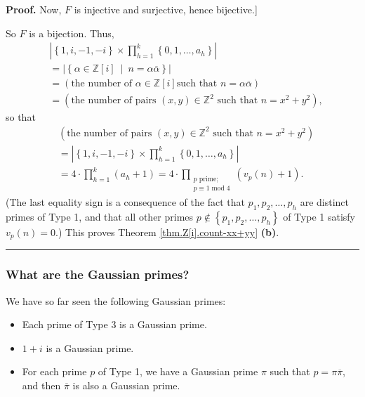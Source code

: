 \documentclass[numbers=enddot,12pt,final,onecolumn,notitlepage]{scrartcl}%
\numberwithin{exer}{subsection}
\theoremstyle{definition}
\newenvironment{proof}[1][Proof]{\noindent\textbf{#1.} }{\ \rule{0.5em}{0.5em}}
\let\prodnonlimits\prod
\renewcommand{\prod}{\prodnonlimits\limits}
\begin{document}
\begin{proof}
Now, $F$ is injective and surjective, hence bijective.]

So $F$ is a bijection. Thus,%
\begin{align*}
&  \left\vert \left\{  1,i,-1,-i\right\}  \times\prod_{h=1}^{k}\left\{
0,1,\ldots,a_{h}\right\}  \right\vert \\
&  =\left\vert \left\{  \alpha\in\mathbb{Z}\left[  i\right]  \ \mid
\ n=\alpha\overline{\alpha}\right\}  \right\vert \\
&  =\left(  \text{the number of }\alpha\in\mathbb{Z}\left[  i\right]  \text{
such that }n=\alpha\overline{\alpha}\right) \\
&  =\left(  \text{the number of pairs }\left(  x,y\right)  \in\mathbb{Z}%
^{2}\text{ such that }n=x^{2}+y^{2}\right)  ,
\end{align*}
so that%
\begin{align*}
&  \left(  \text{the number of pairs }\left(  x,y\right)  \in\mathbb{Z}%
^{2}\text{ such that }n=x^{2}+y^{2}\right) \\
&  =\left\vert \left\{  1,i,-1,-i\right\}  \times\prod_{h=1}^{k}\left\{
0,1,\ldots,a_{h}\right\}  \right\vert \\
&  =4\cdot\prod_{h=1}^{k}\left(  a_{h}+1\right)  =4\cdot\prod
_{\substack{p\text{ prime;}\\p\equiv1\operatorname{mod}4}}\left(  v_{p}\left(
n\right)  +1\right)  .
\end{align*}
(The last equality sign is a consequence of the fact that $p_{1},p_{2}%
,\ldots,p_{h}$ are distinct primes of Type 1, and that all other primes
$p\notin\left\{  p_{1},p_{2},\ldots,p_{h}\right\}  $ of Type 1 satisfy
$v_{p}\left(  n\right)  =0$.) This proves Theorem \ref{thm.Z[i].count-xx+yy}
\textbf{(b)}.
\end{proof}

\subsubsection{What are the Gaussian primes?}

We have so far seen the following Gaussian primes:

\begin{itemize}
\item Each prime of Type 3 is a Gaussian prime.

\item $1+i$ is a Gaussian prime.

\item For each prime $p$ of Type 1, we have a Gaussian prime $\pi$ such that
$p=\pi\overline{\pi}$, and then $\overline{\pi}$ is also a Gaussian prime.
\end{itemize}
\end{document}

